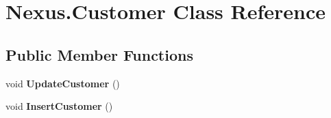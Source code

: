 \hypertarget{class_nexus_1_1_customer}{}\section{Nexus.\+Customer Class Reference}
\label{class_nexus_1_1_customer}
\subsection*{Public Member Functions}
\begin{DoxyCompactItemize}
\item 
\mbox{\label{class_nexus_1_1_customer_ae5004bc48841c1d613130c88879ac3ec}} 
void {\bfseries Update\+Customer} ()
\item 
\mbox{\label{class_nexus_1_1_customer_a38500ece8c84115d0d617f28744adfb6}} 
void {\bfseries Insert\+Customer} ()
\end{DoxyCompactItemize}
